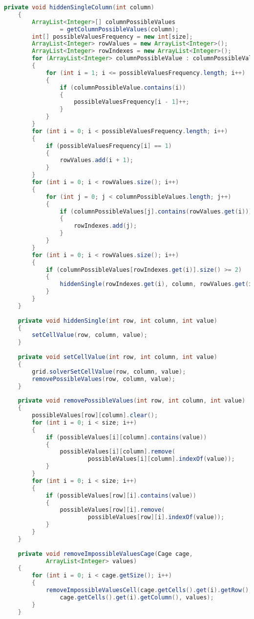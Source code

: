 \begin{lstlisting}[language=Java,basicstyle=\tiny,caption=SolverRuleBased.java]
    private void hiddenSingleColumn(int column)
    {
        ArrayList<Integer>[] columnPossibleValues 
                = getColumnPossibleValues(column);
        int[] possibleValuesFrequency = new int[size];
        ArrayList<Integer> rowValues = new ArrayList<Integer>();
        ArrayList<Integer> rowIndexes = new ArrayList<Integer>();
        for (ArrayList<Integer> columnPossibleValue : columnPossibleValues)
        {
            for (int i = 1; i <= possibleValuesFrequency.length; i++)
            {
                if (columnPossibleValue.contains(i))
                {
                    possibleValuesFrequency[i - 1]++;
                }
            }
        }
        for (int i = 0; i < possibleValuesFrequency.length; i++)
        {
            if (possibleValuesFrequency[i] == 1)
            {
                rowValues.add(i + 1);
            }
        }
        for (int i = 0; i < rowValues.size(); i++)
        {
            for (int j = 0; j < columnPossibleValues.length; j++)
            {
                if (columnPossibleValues[j].contains(rowValues.get(i)))
                {
                    rowIndexes.add(j);
                }
            }
        }
        for (int i = 0; i < rowValues.size(); i++)
        {
            if (columnPossibleValues[rowIndexes.get(i)].size() >= 2)
            {
                hiddenSingle(rowIndexes.get(i), column, rowValues.get(i));
            }
        }
    }
    
    private void hiddenSingle(int row, int column, int value)
    {
        setCellValue(row, column, value);
    }
    
    private void setCellValue(int row, int column, int value)
    {
        grid.solverSetCellValue(row, column, value);
        removePossibleValues(row, column, value);
    }
    
    private void removePossibleValues(int row, int column, int value)
    {
        possibleValues[row][column].clear();
        for (int i = 0; i < size; i++)
        {
            if (possibleValues[i][column].contains(value))
            {
                possibleValues[i][column].remove(
                        possibleValues[i][column].indexOf(value));
            }
        }
        for (int i = 0; i < size; i++)
        {
            if (possibleValues[row][i].contains(value))
            {
                possibleValues[row][i].remove(
                        possibleValues[row][i].indexOf(value));
            }
        }
    }
    
    private void removeImpossibleValuesCage(Cage cage, 
            ArrayList<Integer> values)
    {
        for (int i = 0; i < cage.getSize(); i++)
        {
            removeImpossibleValuesCell(cage.getCells().get(i).getRow(), 
                cage.getCells().get(i).getColumn(), values);
        }
    }
    

\end{lstlisting}
